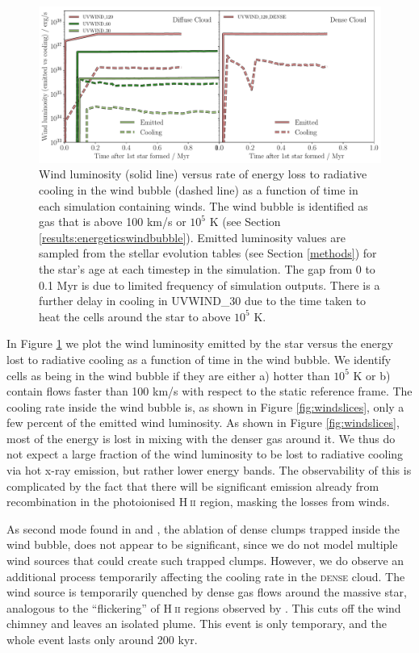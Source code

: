 \documentclass[a4paper,fleqn,usenatbib]{mnras}
\newcommand{\HII}{H$~$\textsc{ii}\xspace}
\begin{document}
\begin{figure}
\includegraphics[width=1.98\columnwidth]{plots/fig5a.pdf}
\caption{Wind luminosity (solid line) versus rate of energy loss to radiative cooling in the wind bubble (dashed line) as a function of time in each simulation containing winds. The wind bubble is identified as gas that is above 100 km/s or $10^5$ K (see Section \protect\ref{results:energeticswindbubble}). Emitted luminosity values are sampled from the stellar evolution tables (see Section \protect\ref{methods}) for the star's age at each timestep in the simulation. The gap from 0 to 0.1 Myr is due to limited frequency of simulation outputs. There is a further delay in cooling in UVWIND\_30 due to the time taken to heat the cells around the star to above $10^5$ K.}
\label{fig:windLemittedvscool}
\end{figure}

In Figure \ref{fig:windLemittedvscool} we plot the wind luminosity emitted by the star versus the energy lost to radiative cooling as a function of time in the wind bubble. We identify cells as being in the wind bubble if they are either a) hotter than $10^5$ K or b) contain flows faster than 100 km/s with respect to the static reference frame. The cooling rate inside the wind bubble is, as shown in Figure \ref{fig:windslices}, only a few percent of the emitted wind luminosity. As shown in Figure \ref{fig:windslices}, most of the energy is lost in mixing with the denser gas around it. We thus do not expect a large fraction of the wind luminosity to be lost to radiative cooling via hot x-ray emission, but rather lower energy bands. The observability of this is complicated by the fact that there will be significant emission already from recombination in the photoionised \HII region, masking the losses from winds.

As second mode found in \cite{Rogers2013} and \cite{Dale2014}, the ablation of dense clumps trapped inside the wind bubble, does not appear to be significant, since we do not model multiple wind sources that could create such trapped clumps. However, we do observe an additional process temporarily affecting the cooling rate in the \textsc{dense} cloud. The wind source is temporarily quenched by dense gas flows around the massive star, analogous to the ``flickering'' of \HII regions observed by \cite{Peters2010}. This cuts off the wind chimney and leaves an isolated plume. This event is only temporary, and the whole event lasts only around 200 kyr.
\end{document}
